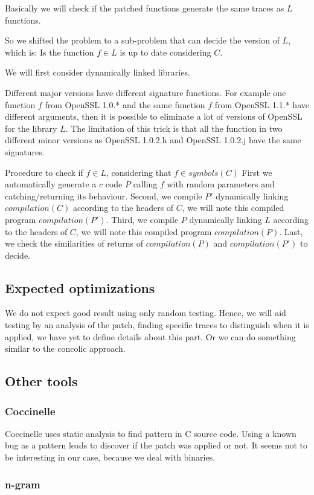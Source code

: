\documentclass{article}
\newcommand{\symb}{{symbols}}
\newcommand{\comp}{{compilation}}
\begin{document}
    Basically we will check if the patched functions generate the same traces
    as $L$ functions.



    So we shifted the problem to a sub-problem that can decide the version of
    $L$, which is: Is the function $f \in L$ is up to date considering $C$.

    We will first consider dynamically linked libraries.
    
    Different major versions have different signature functions. For example one function $f$ from OpenSSL 1.0.* and the same function $f$ from OpenSSL 1.1.* have different arguments, then it is possible to eliminate a lot of versions of OpenSSL for the library $L$. The limitation of this trick is that all the function in two different minor versions as OpenSSL 1.0.2.h and OpenSSL 1.0.2.j have the same signatures.

    Procedure to check if $f \in L$, considering that $f \in \symb(C)$
    First we automatically generate a $c$ code $P$ calling $f$ with random
    parameters and catching/returning its behaviour. 
    Second, we compile $P'$ dynamically linking $\comp(C)$ according to the
    headers of $C$, we will note this compiled program $\comp(P')$. 
    Third, we compile $P$ dynamically linking $L$ according to the headers of
    $C$, we will note this compiled program $\comp(P)$. 
    Last, we check the similarities of returns of $\comp(P)$ and $\comp(P')$
    to decide.


    \subsection{Expected optimizations}
    We do not expect good result using only random testing. Hence, we will aid
    testing by an analysis of the patch, finding specific traces to
    distinguish when it is applied, we have yet to define details about this
    part. 
    Or we can do something similar to the concolic approach.
    

    
    \subsection{Other tools}

		\subsubsection{Coccinelle} 
			Coccinelle uses static analysis to find pattern in C source code. Using a known bug as a pattern leads to discover if the patch was applied or not. It seems not to be interesting in our case, because we deal with binaries.
		\subsubsection{n-gram}
\end{document}
